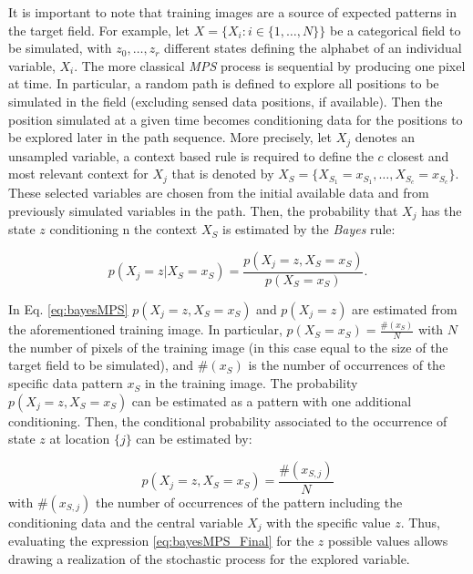 It is important to note that training images are a source of expected patterns in the target field. For example, let $X = \{ X_{i} : i \in \{1,\ldots, N\}  \}$ be a categorical field to be simulated, with $z_0, \ldots, z_r$ different states defining the alphabet of an individual variable, $X_{i}$. The more classical \emph{MPS} process is sequential by producing one pixel at time. In particular, a random path is defined to explore all positions to be simulated in the field (excluding sensed data positions, if available). Then the position simulated at a given time becomes conditioning data for the positions to be explored later in the path sequence. More precisely, let $X_{j}$ denotes an unsampled variable, a context based rule is required to define the $c$ closest and most relevant context for  $X_{j}$  that is denoted by $X_S = \{ X_{S_1} = x_{S_1}, \ldots, X_{S_c} = x_{S_c} \}$. These selected variables are chosen from the initial available data and from previously simulated variables in the path. Then, the probability that $X_{j}$ has the state $z$ conditioning n the context $X_{S}$ is estimated by the \emph{Bayes} rule:

\begin{equation}
p(X_{j} = z | X_{S} = x_{S}) = \frac{p(X_{j} = z, X_{S} = x_{S}) }{p(X_{S} = x_{S}) } .
\label{eq:bayesMPS}
\end{equation}


In Eq. \eqref{eq:bayesMPS} $p(X_{j} = z, X_{S} = x_{S}) $ and $p( X_{j} = z)$ are estimated from the aforementioned training image. In particular, $p( X_{S} = x_{S}) = \frac{\#(x_{S})}{N}$ with $N$ the number of pixels of the training image (in this case equal to the size of the target field to be simulated), and $\#(x_{S})$ is the number of occurrences of the specific data pattern $x_{S}$ in the training image. The probability $p(X_{j} = z, X_{S} = x_{S}) $ can be estimated as a pattern with one additional conditioning. Then, the conditional probability associated to the occurrence of state $z$ at location $\{j\}$ can be estimated by:

\begin{equation}
p(X_{j} = z, X_{S} = x_{S})  =  \frac{\#(x_{S,j})}{N}
\label{eq:bayesMPS_Final}
\end{equation}
with $\#(x_{S,j})$ the number of occurrences of the pattern including the conditioning data and the central variable $X_{j}$ with the specific value $z$. Thus, evaluating the expression \eqref{eq:bayesMPS_Final} for the $z$ possible values allows drawing a realization of the stochastic process for the explored variable.










